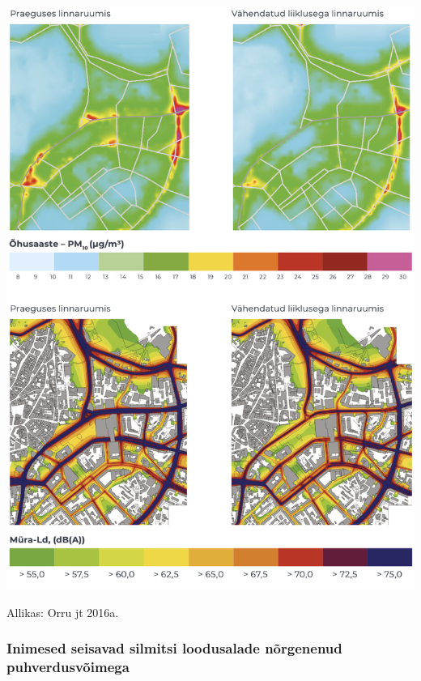 \documentclass[estonian,]{article}
\begin{document}
\begin{center}\includegraphics[width=0.9\linewidth]{figures/3-chapter/fig323} \end{center}

\begin{imgsource}
{Allikas:} Orru jt 2016a.
\end{imgsource}

\hypertarget{inimesed-seisavad-silmitsi-loodusalade-nuxf5rgenenud-puhverdusvuxf5imega}{%
\subsubsection*{Inimesed seisavad silmitsi loodusalade nõrgenenud puhverdusvõimega}\label{inimesed-seisavad-silmitsi-loodusalade-nuxf5rgenenud-puhverdusvuxf5imega}}
\end{document}
